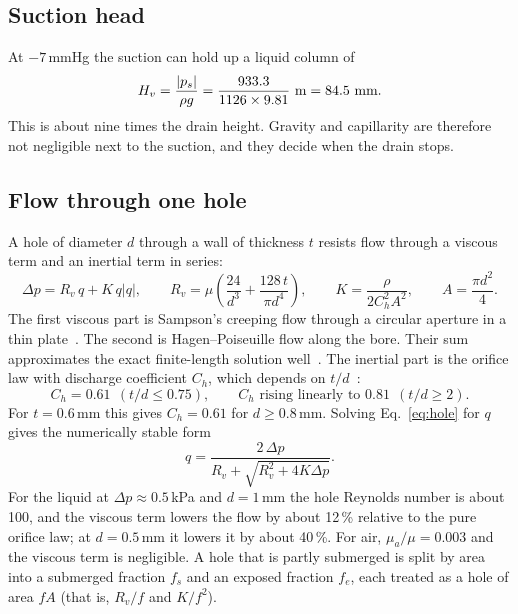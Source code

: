 \documentclass[10pt,a4paper]{article}
\begin{document}
\subsection{Suction head}
At $-7$\,mmHg the suction can hold up a liquid column of
\begin{equation}
H_v=\frac{|p_s|}{\rho g}=\frac{933.3}{1126\times9.81}\ \text{m}=84.5\ \text{mm}.
\label{eq:Hv}
\end{equation}
This is about nine times the drain height. Gravity and capillarity are therefore not negligible next to the suction, and they decide when the drain stops.

\subsection{Flow through one hole}
A hole of diameter $d$ through a wall of thickness $t$ resists flow through a viscous term and an inertial term in series:
\begin{equation}
\Delta p = R_v\,q + K\,q|q|, \qquad
R_v = \mu\left(\frac{24}{d^3} + \frac{128\,t}{\pi d^4}\right), \qquad
K = \frac{\rho}{2C_h^2A^2}, \qquad A=\frac{\pi d^2}{4}.
\label{eq:hole}
\end{equation}
The first viscous part is Sampson's creeping flow through a circular aperture in a thin plate~\cite{sampson1891}. The second is Hagen--Poiseuille flow along the bore. Their sum approximates the exact finite-length solution well~\cite{dagan1982}. The inertial part is the orifice law with discharge coefficient $C_h$, which depends on $t/d$~\cite{lichtarowicz1965}:
\begin{equation}
C_h = 0.61 \ \ (t/d\le0.75), \qquad C_h \text{ rising linearly to } 0.81 \ \ (t/d\ge2).
\label{eq:cd}
\end{equation}
For $t=0.6$\,mm this gives $C_h=0.61$ for $d\ge0.8$\,mm. Solving Eq.~\eqref{eq:hole} for $q$ gives the numerically stable form
\begin{equation}
q=\frac{2\,\Delta p}{R_v+\sqrt{R_v^2+4K\Delta p}}.
\label{eq:hole-q}
\end{equation}
For the liquid at $\Delta p\approx0.5$\,kPa and $d=1$\,mm the hole Reynolds number is about 100, and the viscous term lowers the flow by about 12\,\% relative to the pure orifice law; at $d=0.5$\,mm it lowers it by about 40\,\%. For air, $\mu_a/\mu=0.003$ and the viscous term is negligible. A hole that is partly submerged is split by area into a submerged fraction $f_s$ and an exposed fraction $f_e$, each treated as a hole of area $fA$ (that is, $R_v/f$ and $K/f^2$).
\end{document}
